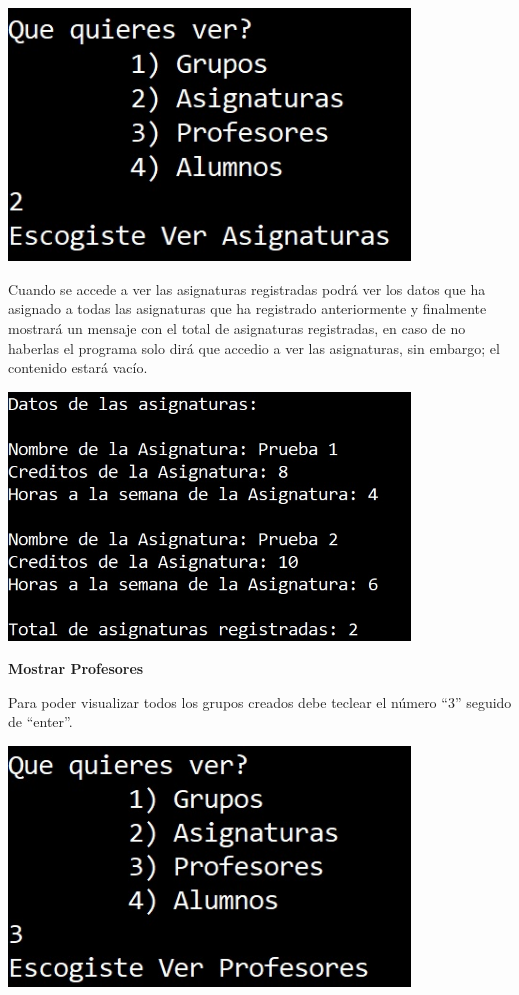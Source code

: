 \documentclass[12pt]{report}
\begin{document}
\begin{center}
    \includegraphics[width=0.8\textwidth]{img/Opcion 6 P2_2.jpg}
\end{center}

Cuando se accede a ver las asignaturas registradas podrá ver los datos que ha asignado a todas las asignaturas que ha registrado anteriormente y finalmente mostrará un mensaje con el total de asignaturas registradas, en caso de no haberlas el programa solo dirá que accedio a ver las asignaturas, sin embargo; el contenido estará vacío.

\begin{center}
    \includegraphics[width=0.8\textwidth]{img/Opcion 6 P2_2_1.jpg}
\end{center}

\newpage
\hspace{1cm} \textbf{Mostrar Profesores}

Para poder visualizar todos los grupos creados debe teclear el número ``3'' seguido de ``enter''. 

\begin{center}
    \includegraphics[width=0.8\textwidth]{img/Opcion 6 P2_3.jpg}
\end{center}
\end{document}
